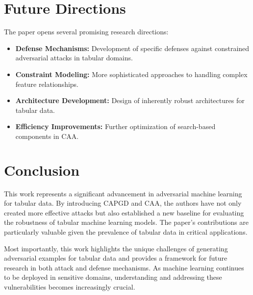 \documentclass{article}
\begin{document}
\section*{Future Directions}

The paper opens several promising research directions:
\begin{itemize}
    \item \textbf{Defense Mechanisms:} Development of specific defenses against constrained adversarial attacks in tabular domains.
    \item \textbf{Constraint Modeling:} More sophisticated approaches to handling complex feature relationships.
    \item \textbf{Architecture Development:} Design of inherently robust architectures for tabular data.
    \item \textbf{Efficiency Improvements:} Further optimization of search-based components in CAA.
\end{itemize}

\section*{Conclusion}

This work represents a significant advancement in adversarial machine learning for tabular data. By introducing CAPGD and CAA, the authors have not only created more effective attacks but also established a new baseline for evaluating the robustness of tabular machine learning models. The paper's contributions are particularly valuable given the prevalence of tabular data in critical applications.

Most importantly, this work highlights the unique challenges of generating adversarial examples for tabular data and provides a framework for future research in both attack and defense mechanisms. As machine learning continues to be deployed in sensitive domains, understanding and addressing these vulnerabilities becomes increasingly crucial.
\end{document}
